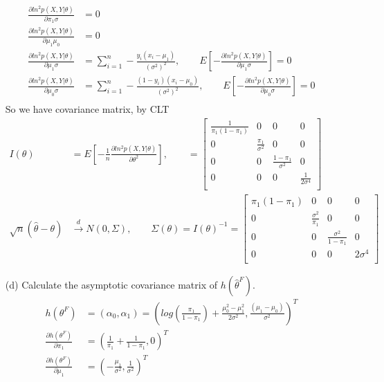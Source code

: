 \documentclass[11pt]{article} %
\begin{document}
\begin{itemize}
\begin{align*}
		\frac{\partial ln^2 p(X, Y|\theta)}{\partial \pi_1\sigma}  &=0\\
		\frac{\partial ln^2 p(X, Y|\theta)}{\partial \mu_1\mu_0}  &=0\\
		\frac{\partial ln^2 p(X, Y|\theta)}{\partial \mu_1\sigma}  &= \sum_{i=1}^n - \frac{y_i(x_i-\mu_1)}{(\sigma^2)^2} , \qquad E[-\frac{\partial ln^2 p(X, Y|\theta)}{\partial \mu_1\sigma}] = 0  \\
		\frac{\partial ln^2 p(X, Y|\theta)}{\partial \mu_0\sigma}  &= \sum_{i=1}^n - \frac{(1-y_i)(x_i-\mu_0)}{(\sigma^2)^2} , \qquad E[-\frac{\partial ln^2 p(X, Y|\theta)}{\partial \mu_0\sigma}] = 0 \\
	\end{align*} 
	So we have covariance matrix, by CLT
	\begin{align*}    
		I(\theta) &= E[- \frac{1}{n} \frac{\partial ln^2 p(X,Y|\theta)}{\partial \theta^2}], \qquad
		= \begin{bmatrix}
			\frac{1}{\pi_1(1-\pi_1)} & 0 & 0 & 0\\
			0 & \frac{\pi_1}{\sigma^2} & 0 & 0\\
			0 & 0 & \frac{1-\pi_1}{\sigma^2} & 0\\
			0 & 0 & 0 & \frac{1}{2\sigma^4} \\
		\end{bmatrix}\\
		\sqrt{n} (\hat{\theta} - \theta) & \xrightarrow[]{d} N \left(0, \Sigma \right), \qquad
		\Sigma(\theta) = I(\theta)^{-1} = \begin{bmatrix}
			\pi_1(1-\pi_1) & 0 & 0 & 0\\
			0 & \frac{\sigma^2}{ \pi_1} & 0 & 0\\
			0 & 0 & \frac{\sigma^2}{ 1-\pi_1} & 0\\
			0 & 0 & 0 & 2\sigma^4 \\
		\end{bmatrix}
	\end{align*} 
	\item[(d)] Calculate the asymptotic covariance matrix of $h(\hat\theta^F )$.
	\begin{align*}    
		h(\theta^F ) &= (\alpha_0, \alpha_1)= \left(log(\frac{\pi_1}{1-\pi_1}) +\frac{\mu_0^2 - \mu_1^2}{2\sigma^2},  \frac{(\mu_1-\mu_0)}{\sigma^2} \right)^T\\
		\frac{\partial h(\theta^F)}{\partial \pi_1} & = (\frac{1}{\pi_1}+\frac{1}{1-\pi_1} , 0)^T\\
		\frac{\partial h(\theta^F )}{\partial \mu_1} & = (-\frac{\mu_1}{\sigma^2}, \frac{1}{\sigma^2})^T\\

\end{align*}
\end{itemize}
\end{document}
